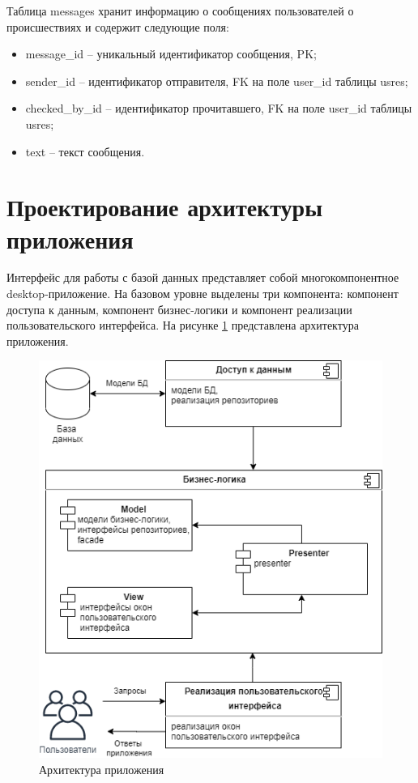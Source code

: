 Таблица messages хранит информацию о сообщениях пользователей о происшествиях и содержит следующие поля:
\begin{itemize}
	\item message\_id -- уникальный идентификатор сообщения, PK;
	\item sender\_id -- идентификатор отправителя, FK на поле user\_id таблицы usres;
	\item checked\_by\_id -- идентификатор прочитавшего, FK на поле user\_id таблицы usres;
	\item text -- текст сообщения.	
\end{itemize}


\section{Проектирование архитектуры приложения}

Интерфейс для работы с базой данных представляет собой  многокомпонентное desktop-приложение. На базовом уровне выделены три компонента: компонент доступа к данным, компонент бизнес-логики и компонент реализации пользовательского интерфейса. На рисунке \ref{img:components} представлена архитектура приложения.

\begin{figure}[h!]
	\begin{center}
		\includegraphics[scale=0.7]{../imgs/uml/components.png}
	\end{center}
	\captionsetup{justification=centering}
	\caption{Архитектура приложения}
	\label{img:components}
\end{figure}

